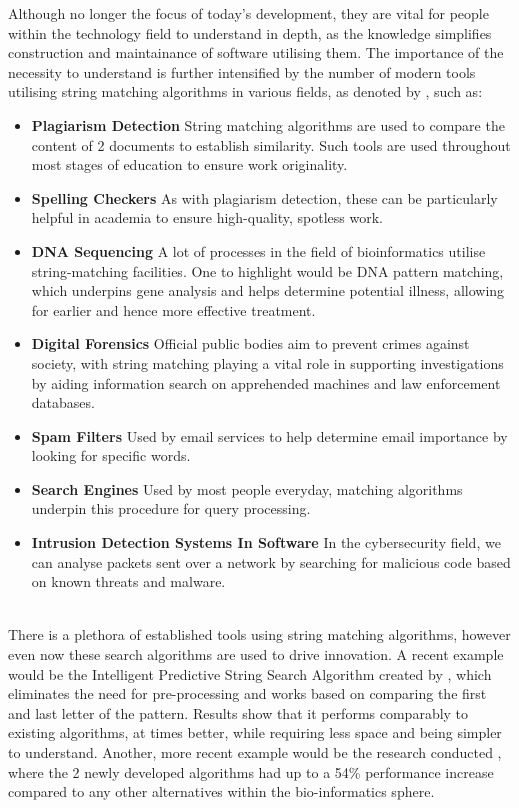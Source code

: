 \documentclass{l4proj}
\begin{document}
Although no longer the focus of today's development, they are vital for people within the technology field to understand in depth, as the knowledge simplifies construction and maintainance of software utilising them. The importance of the necessity to understand is further intensified by the number of modern tools utilising string matching algorithms in various fields, as denoted by \citet{GeeksforGeeks_2022}, such as:
\begin{itemize}
  \item \textbf{Plagiarism Detection} String matching algorithms are used to compare the content of 2 documents to establish similarity. Such tools are used throughout most stages of education to ensure work originality.
\item \textbf{Spelling Checkers} As with plagiarism detection, these can be particularly helpful in academia to ensure high-quality, spotless work.
  \item \textbf{DNA Sequencing} A lot of processes in the field of bioinformatics utilise string-matching facilities. One to highlight would be DNA pattern matching, which underpins gene analysis and helps determine potential illness, allowing for earlier and hence more effective treatment.
  \item \textbf{Digital Forensics} Official public bodies aim to prevent crimes against society, with string matching playing a vital role in supporting investigations by aiding information search on apprehended machines and law enforcement databases.
  \item \textbf{Spam Filters} Used by email services to help determine email importance by looking for specific words.
  \item \textbf{Search Engines} Used by most people everyday, matching algorithms underpin this procedure for query processing.
  \item \textbf{Intrusion Detection Systems In Software} In the cybersecurity field, we can analyse packets sent over a network by searching for malicious code based on known threats and malware.
\end{itemize}

\\


There is a plethora of established tools using string matching algorithms, however even now these search algorithms are used to drive innovation. A recent example would be the Intelligent Predictive String Search Algorithm created by \cite{GURUNG2016161}, which eliminates the need for pre-processing and works based on comparing the first and last letter of the pattern. Results show that it performs comparably to existing algorithms, at times better, while requiring less space and being simpler to understand. Another, more recent example would be the research conducted \cite{Ibrahim2023}, where the 2 newly developed algorithms had up to a 54\% performance increase compared to any other alternatives within the bio-informatics sphere.
\\
\end{document}
